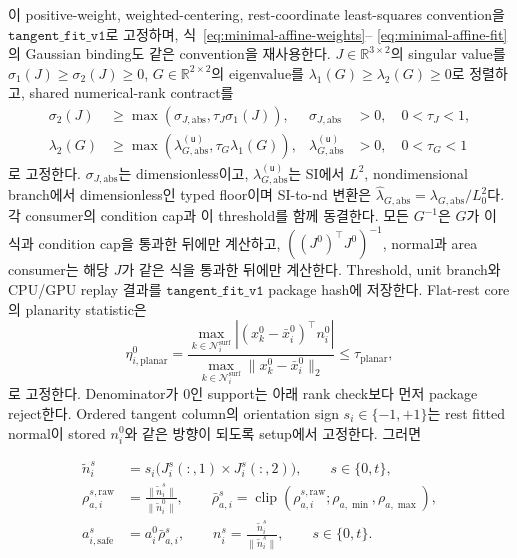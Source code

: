 \documentclass[11pt]{article}
\begin{document}
이 positive-weight, weighted-centering, rest-coordinate least-squares convention을
\(\texttt{tangent\_fit\_v1}\)로 고정하며, 식~\eqref{eq:minimal-affine-weights}--
\eqref{eq:minimal-affine-fit}의 Gaussian binding도 같은 convention을 재사용한다.
\(J\in\mathbb R^{3\times2}\)의 singular value를
\(\sigma_1(J)\geq\sigma_2(J)\geq0\),
\(G\in\mathbb R^{2\times2}\)의 eigenvalue를
\(\lambda_1(G)\geq\lambda_2(G)\geq0\)로 정렬하고, shared numerical-rank contract를
\begin{equation}
\begin{aligned}
  \sigma_2(J)
  &\geq\max\!\left(\sigma_{J,\mathrm{abs}},\tau_J\sigma_1(J)\right),
  &\sigma_{J,\mathrm{abs}}&>0,\quad 0<\tau_J<1,\\
  \lambda_2(G)
  &\geq\max\!\left(\lambda_{G,\mathrm{abs}}^{(\mathsf u)},
                    \tau_G\lambda_1(G)\right),
  &\lambda_{G,\mathrm{abs}}^{(\mathsf u)}&>0,\quad 0<\tau_G<1
\end{aligned}
  \label{eq:minimal-tangent-numerical-rank}
\end{equation}
로 고정한다. \(\sigma_{J,\mathrm{abs}}\)는 dimensionless이고,
\(\lambda_{G,\mathrm{abs}}^{(\mathsf u)}\)는 SI에서 \(L^2\), nondimensional branch에서
dimensionless인 typed floor이며 SI-to-nd 변환은
\(\widehat\lambda_{G,\mathrm{abs}}=\lambda_{G,\mathrm{abs}}/L_0^2\)다.
각 consumer의 condition cap과 이 threshold를 함께 동결한다. 모든 \(G^{-1}\)은 \(G\)가 이 식과
condition cap을 통과한 뒤에만 계산하고, \(((J^0)^\top J^0)^{-1}\), normal과 area consumer는
해당 \(J\)가 같은 식을 통과한 뒤에만 계산한다. Threshold, unit branch와 CPU/GPU replay 결과를
\(\texttt{tangent\_fit\_v1}\) package hash에 저장한다.
Flat-rest core의 planarity statistic은
\begin{equation}
  \eta_{i,\mathrm{planar}}^0
  =
  \frac{
    \max_{k\in\mathcal N_i^{\mathrm{surf}}}
    \left|(x_k^0-\bar x_i^0)^\top n_i^0\right|
  }{
    \max_{k\in\mathcal N_i^{\mathrm{surf}}}
    \|x_k^0-\bar x_i^0\|_2
  }
  \leq\tau_{\mathrm{planar}},
  \label{eq:minimal-flat-rest-planarity}
\end{equation}
로 고정한다. Denominator가 0인 support는 아래 rank check보다 먼저 package reject한다.
Ordered tangent column의 orientation sign \(s_i\in\{-1,+1\}\)는 rest fitted normal이
stored \(n_i^0\)와 같은 방향이 되도록 setup에서 고정한다. 그러면

\begin{equation}
\begin{aligned}
  \widetilde n_i^s
  &=s_i\bigl(J_i^s(:,1)\times J_i^s(:,2)\bigr),\qquad s\in\{0,t\},\\
  \rho_{a,i}^{s,\mathrm{raw}}
  &=\frac{\|\widetilde n_i^s\|}{\|\widetilde n_i^0\|},\qquad
  \bar\rho_{a,i}^s
  =\operatorname{clip}\!\left(
    \rho_{a,i}^{s,\mathrm{raw}};
    \rho_{a,\min},\rho_{a,\max}\right),\\
  a_{i,\mathrm{safe}}^s
  &=a_i^0\bar\rho_{a,i}^s,\qquad
  n_i^s=\frac{\widetilde n_i^s}{\|\widetilde n_i^s\|},
  \qquad s\in\{0,t\}.
\end{aligned}
  \label{eq:minimal-area-normal}
\end{equation}
\end{document}

